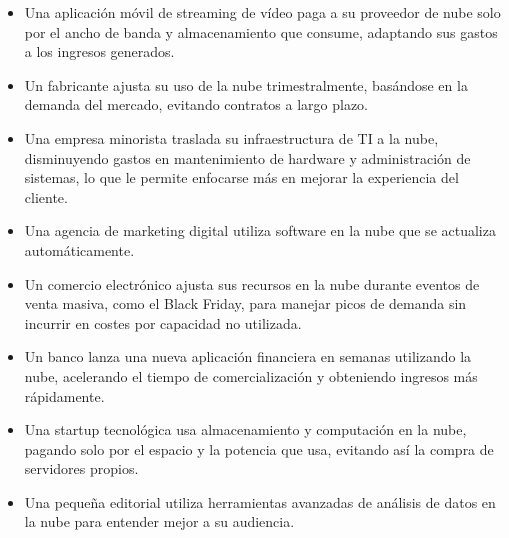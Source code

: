 

\begin{solution}
	\begin{itemize}
		\item Una aplicación móvil de streaming de vídeo paga a su proveedor de nube solo por el ancho de banda y almacenamiento que consume, adaptando sus gastos a los ingresos generados.
		\item Un fabricante ajusta su uso de la nube trimestralmente, basándose en la demanda del mercado, evitando contratos a largo plazo.
	\end{itemize}

	\begin{itemize}
		\item Una empresa minorista traslada su infraestructura de TI a la nube, disminuyendo gastos en mantenimiento de hardware y administración de sistemas, lo que le permite enfocarse más en mejorar la experiencia del cliente.

		\item Una agencia de marketing digital utiliza software en la nube que se actualiza automáticamente.
	\end{itemize}
	\begin{itemize}
		\item Un comercio electrónico ajusta sus recursos en la nube durante eventos de venta masiva, como el Black Friday, para manejar picos de demanda sin incurrir en costes por capacidad no utilizada.
	\end{itemize}

	\begin{itemize}
		\item Un banco lanza una nueva aplicación financiera en semanas utilizando la nube, acelerando el tiempo de comercialización y obteniendo ingresos más rápidamente.
	\end{itemize}

	\begin{itemize}
		\item Una startup tecnológica usa almacenamiento y computación en la nube, pagando solo por el espacio y la potencia que usa, evitando así la compra de servidores propios.
		\item Una pequeña editorial utiliza herramientas avanzadas de análisis de datos en la nube para entender mejor a su audiencia.
	\end{itemize}


\end{solution}
